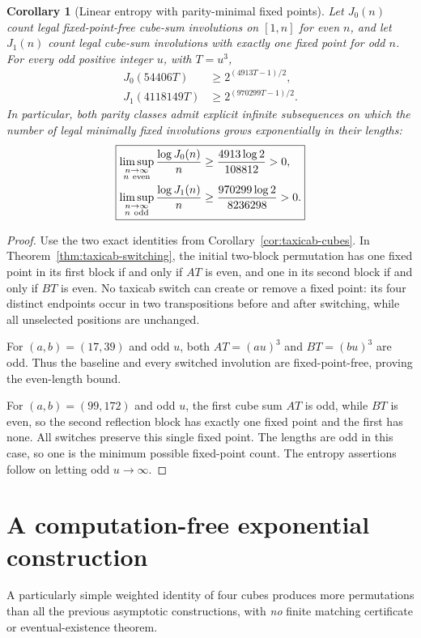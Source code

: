\documentclass[10pt]{article}
\newtheorem{corollary}{Corollary}
\begin{document}
\begin{corollary}[Linear entropy with parity-minimal fixed points]
\label{cor:taxicab-minimal-fixed}
Let $J_0(n)$ count legal fixed-point-free
cube-sum involutions on $[1,n]$ for
even $n$, and let $J_1(n)$ count
legal cube-sum involutions with
exactly one fixed point for odd $n$.
For every \emph{odd} positive integer
$u$, with $T=u^3$,
\[
\boxed{\begin{aligned}
J_0(54406T)&\ge2^{(4913T-1)/2},\\
J_1(4118149T)&\ge2^{(970299T-1)/2}.
\end{aligned}}
\]
In particular, both parity classes
admit explicit infinite subsequences
on which the number of legal
\emph{minimally fixed} involutions
grows exponentially in their lengths:
\[
\boxed{\begin{aligned}
\limsup_{\substack{n\to\infty\\n\ {\rm even}}}
 \frac{\log J_0(n)}n
 &\ge\frac{4913\log2}{108812}>0,\\
\limsup_{\substack{n\to\infty\\n\ {\rm odd}}}
 \frac{\log J_1(n)}n
 &\ge\frac{970299\log2}{8236298}>0.
\end{aligned}}
\]
\end{corollary}
\begin{proof}
Use the two exact identities
from Corollary~\ref{cor:taxicab-cubes}.
In Theorem~\ref{thm:taxicab-switching},
the initial two-block permutation
has one fixed point in its first
block if and only if $AT$ is even,
and one in its second block if
and only if $BT$ is even.
No taxicab switch can create or
remove a fixed point: its four
distinct endpoints occur in
two transpositions before and
after switching, while all
unselected positions are unchanged.

For $(a,b)=(17,39)$ and odd $u$,
both $AT=(au)^3$ and
$BT=(bu)^3$ are odd.
Thus the baseline and every
switched involution are
fixed-point-free, proving
the even-length bound.

For $(a,b)=(99,172)$ and odd $u$,
the first cube sum $AT$ is odd,
while $BT$ is even, so the
second reflection block has
exactly one fixed point
and the first has none.
All switches preserve this
single fixed point.
The lengths are odd in this
case, so one is the minimum
possible fixed-point count.
The entropy assertions follow
on letting odd $u\to\infty$.
\end{proof}

\section{A computation-free exponential construction}
\label{sec:three-cycle}
A particularly simple weighted identity of four cubes
produces more permutations than all the previous
asymptotic constructions, with \emph{no} finite
matching certificate or eventual-existence theorem.
\end{document}
